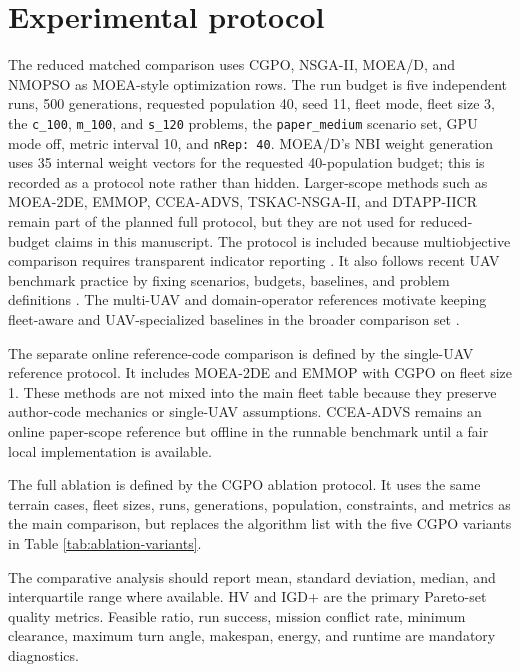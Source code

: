 \documentclass[a4paper,fleqn]{cas-dc}
\begin{document}
\section{Experimental protocol}
\label{sec:experimental-protocol}

The reduced matched comparison uses CGPO, NSGA-II, MOEA/D, and NMOPSO as MOEA-style optimization rows. The run budget is five independent runs, 500 generations, requested population 40, seed 11, fleet mode, fleet size 3, the \texttt{c\_100}, \texttt{m\_100}, and \texttt{s\_120} problems, the \texttt{paper\_medium} scenario set, GPU mode off, metric interval 10, and \texttt{nRep: 40}. MOEA/D's NBI weight generation uses 35 internal weight vectors for the requested 40-population budget; this is recorded as a protocol note rather than hidden. Larger-scope methods such as MOEA-2DE, EMMOP, CCEA-ADVS, TSKAC-NSGA-II, and DTAPP-IICR remain part of the planned full protocol, but they are not used for reduced-budget claims in this manuscript. The protocol is included because multiobjective comparison requires transparent indicator reporting \cite{zitzler2003performance}. It also follows recent UAV benchmark practice by fixing scenarios, budgets, baselines, and problem definitions \cite{darlan2025benchmark}. The multi-UAV and domain-operator references motivate keeping fleet-aware and UAV-specialized baselines in the broader comparison set \cite{meng2025emmop,darlan2026domainops}.

The separate online reference-code comparison is defined by the single-UAV reference protocol. It includes MOEA-2DE and EMMOP with CGPO on fleet size 1. These methods are not mixed into the main fleet table because they preserve author-code mechanics or single-UAV assumptions. CCEA-ADVS remains an online paper-scope reference but offline in the runnable benchmark until a fair local implementation is available.

The full ablation is defined by the CGPO ablation protocol. It uses the same terrain cases, fleet sizes, runs, generations, population, constraints, and metrics as the main comparison, but replaces the algorithm list with the five CGPO variants in Table \ref{tab:ablation-variants}.

The comparative analysis should report mean, standard deviation, median, and interquartile range where available. HV and IGD+ are the primary Pareto-set quality metrics. Feasible ratio, run success, mission conflict rate, minimum clearance, maximum turn angle, makespan, energy, and runtime are mandatory diagnostics.
\end{document}

